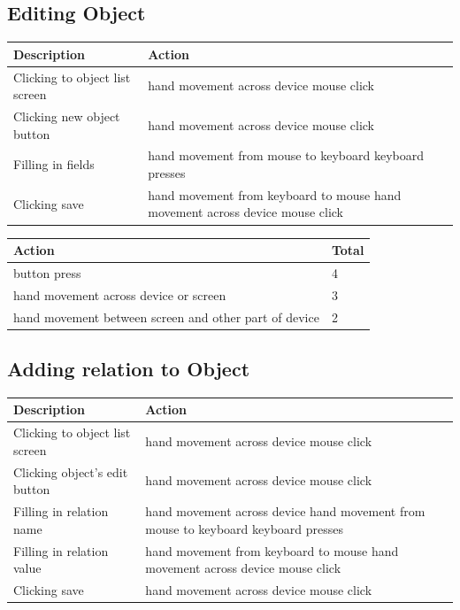 \documentclass[12pt, letter]{article}
\begin{document}
\subsection{Editing Object}

\begin{tabular}[H]{|p{5cm} | p{10cm}|}
\hline
Description & Action \\
\hline
Clicking to object list screen & hand movement across device \newline mouse click \\
Clicking new object button & hand movement across device \newline mouse click \\
Filling in fields &  hand movement from mouse to keyboard \newline keyboard presses \\
Clicking save & hand movement from keyboard to mouse \newline hand movement across device \newline mouse click \\
\hline
\end{tabular}

\vspace{.25cm}

\begin{tabular}[H]{|p{10cm}|p{2cm}|}
\hline
Action & Total \\
\hline
button press & 4 \\
hand movement across device or screen & 3 \\
hand movement between screen and other part of device & 2 \\
\hline
\end{tabular}

\subsection{Adding relation to Object}

\begin{tabular}[H]{|p{5cm} | p{10cm}|}
\hline
Description & Action \\
\hline
Clicking to object list screen & hand movement across device \newline mouse click \\
Clicking object's edit button & hand movement across device \newline mouse click \\
Filling in relation name &  hand movement across device \newline hand movement from mouse to keyboard \newline keyboard presses \\
Filling in relation value & hand movement from keyboard to mouse \newline hand movement across device \newline mouse click \\
Clicking save & hand movement across device \newline mouse click \\
\hline
\end{tabular}
\end{document}
